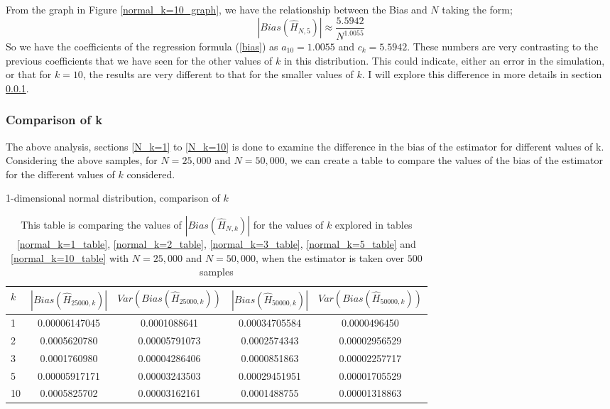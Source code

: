 \documentclass{article}
\begin{document}
From the graph in Figure \ref{normal_k=10_graph}, we have the relationship between the Bias and $N$ taking the form;
\begin{equation}
|Bias(\hat{H}_{N, 5})| \approx \frac{5.5942}{N^{1.0055}} \nonumber
\end{equation}
So we have the coefficients of the regression formula (\ref{bias}) as $a_{10} = 1.0055$ and $c_{k} = 5.5942$. These numbers are very contrasting to the previous coefficients that we have seen for the other values of $k$ in this distribution. This could indicate, either an error in the simulation, or that for $k=10$, the results are very different to that for the smaller values of $k$. I will explore this difference in more details in section \ref{N_compare_k}.




\subsubsection{Comparison of k} \label{N_compare_k}
The above analysis, sections \ref{N_k=1} to \ref{N_k=10} is done to examine the difference in the bias of the estimator for different values of k. Considering the above samples, for $N=25,000$ and $N=50,000$, we can create a table to compare the values of the bias of the estimator for the different values of $k$ considered.

\begin{table}
\caption{1-dimensional normal distribution, comparison of $k$} \label{normal_kcompare_table}
\begin{center}
\begin{tabular}{| l | c c c c|} 
\toprule
$k$ & $|Bias(\hat{H}_{25000, k})|$ & $Var(Bias(\hat{H}_{25000, k}))$ & $|Bias(\hat{H}_{50000, k})|$ & $Var(Bias(\hat{H}_{50000, k}) )$ \\
\midrule[1pt]
1    & 0.00006147045   & 0.0001088641     & 0.00034705584   & 0.0000496450   \\
2    & 0.0005620780     & 0.00005791073   & 0.0002574343     & 0.00002956529 \\
3    & 0.0001760980     & 0.00004286406   & 0.0000851863     & 0.00002257717 \\
5    & 0.00005917171   & 0.00003243503   & 0.00029451951   & 0.00001705529 \\
10  & 0.0005825702     & 0.00003162161   & 0.0001488755     & 0.00001318863 \\
\hline
\end{tabular}
\\[10pt]
\caption*{This table is comparing the values of $|Bias(\hat{H}_{N, k})|$ for the values of $k$ explored in tables \ref{normal_k=1_table}, \ref{normal_k=2_table}, \ref{normal_k=3_table}, \ref{normal_k=5_table} and  \ref{normal_k=10_table} with $N=25,000$ and $N=50,000$, when the estimator is taken over $500$ samples}
\end{center}
\end{table}
\end{document}
